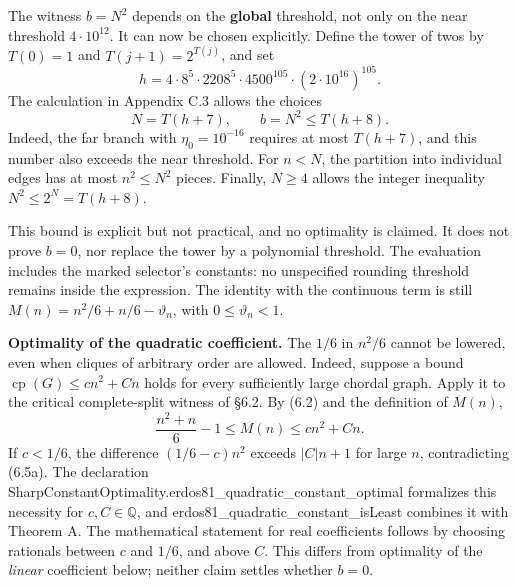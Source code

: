 \documentclass[english,11pt,a4paper]{article}
\begin{document}
The witness \(b=N^2\) depends on the \textbf{global} threshold, not only on the near threshold \(4\cdot10^{12}\). It can now be chosen explicitly. Define the tower of twos by \(T(0)=1\) and \(T(j+1)=2^{T(j)}\), and set \[
h=4\cdot8^5\cdot2208^5\cdot4500^{105}\cdot(2\cdot10^{16})^{105}.
\] The calculation in Appendix C.3 allows the choices \[
N=T(h+7),\qquad b=N^2\le T(h+8).
\] Indeed, the far branch with \(\eta_0=10^{-16}\) requires at most \(T(h+7)\), and this number also exceeds the near threshold. For \(n<N\), the partition into individual edges has at most \(n^2\le N^2\) pieces. Finally, \(N\ge4\) allows the integer inequality \(N^2\le2^N=T(h+8)\).

This bound is explicit but not practical, and no optimality is claimed. It does not prove \(b=0\), nor replace the tower by a polynomial threshold. The evaluation includes the marked selector's constants: no unspecified rounding threshold remains inside the expression. The identity with the continuous term is still \(M(n)=n^2/6+n/6-\vartheta_n\), with \(0\le\vartheta_n<1\).

\textbf{Optimality of the quadratic coefficient.} The \(1/6\) in \(n^2/6\) cannot be lowered, even when cliques of arbitrary order are allowed. Indeed, suppose a bound \(\operatorname{cp}(G)\le c n^2+C n\) holds for every sufficiently large chordal graph. Apply it to the critical complete-split witness of §6.2. By (6.2) and the definition of \(M(n)\), \[
\frac{n^2+n}{6}-1\le M(n)\le cn^2+Cn.
\tag{6.5a}
\] If \(c<1/6\), the difference \((1/6-c)n^2\) exceeds \(|C|n+1\) for large \(n\), contradicting (6.5a). The declaration {\ttfamily\small SharpConstan\discretionary{\hbox{\ensuremath{\hookrightarrow}}}{}{}tOptimality.\discretionary{\hbox{\ensuremath{\hookrightarrow}}}{}{}erdos81\_\discretionary{\hbox{\ensuremath{\hookrightarrow}}}{}{}quadratic\_\discretionary{\hbox{\ensuremath{\hookrightarrow}}}{}{}constant\_\discretionary{\hbox{\ensuremath{\hookrightarrow}}}{}{}optimal} formalizes this necessity for \(c,C\in\mathbb Q\), and {\ttfamily\small erdos81\_\discretionary{\hbox{\ensuremath{\hookrightarrow}}}{}{}quadratic\_\discretionary{\hbox{\ensuremath{\hookrightarrow}}}{}{}constant\_\discretionary{\hbox{\ensuremath{\hookrightarrow}}}{}{}isLeast} combines it with Theorem A. The mathematical statement for real coefficients follows by choosing rationals between \(c\) and \(1/6\), and above \(C\). This differs from optimality of the \emph{linear} coefficient below; neither claim settles whether \(b=0\).
\end{document}
